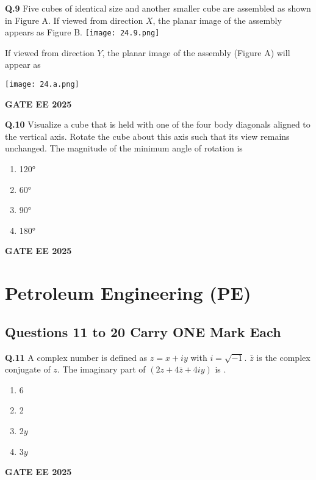 \documentclass{article}
\begin{document}
\vspace{0.5cm}

\textbf{Q.9} Five cubes of identical size and another smaller cube are assembled as shown in Figure A. If viewed from direction $X$, the planar image of the assembly appears as Figure B.
\texttt{[image: 24.9.png]}


If viewed from direction $Y$, the planar image of the assembly (Figure A) will appear as
\begin{enumerate}[label=(\Alph*)]
\texttt{[image: 24.a.png]}

\end{enumerate}
\textbf{GATE EE 2025}

\vspace{0.5cm}

\textbf{Q.10} Visualize a cube that is held with one of the four body diagonals aligned to the vertical axis. Rotate the cube about this axis such that its view remains unchanged. The magnitude of the minimum angle of rotation is
\begin{enumerate}[label=(\Alph*)]
    \item 120°
    \item 60°
    \item 90°
    \item 180°
\end{enumerate}
\textbf{GATE EE 2025}

\vspace{0.5cm}

\section*{Petroleum Engineering (PE)}

\subsection*{Questions 11 to 20 Carry ONE Mark Each}

\textbf{Q.11} A complex number is defined as $z = x + iy$ with $i = \sqrt{-1}$. $\bar{z}$ is the complex conjugate of $z$. The imaginary part of $(2z + 4\bar{z} + 4iy)$ is \underline{\hspace{1cm}}.
\begin{enumerate}[label=(\Alph*)]
    \item 6
    \item 2
    \item 2$y$
    \item 3$y$
\end{enumerate}
\textbf{GATE EE 2025}
\end{document}
